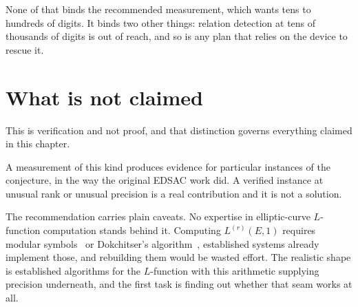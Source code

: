 None of that binds the recommended measurement, which wants tens to hundreds of digits. It binds two
other things: relation detection at tens of thousands of digits is out of reach, and so is any plan
that relies on the device to rescue it.

\section{What is not claimed}

This is verification and not proof, and that distinction governs everything claimed in this
chapter.

A measurement of this kind produces evidence for particular instances of the conjecture, in the way
the original EDSAC work did. A verified instance at unusual rank or unusual precision is a real
contribution and it is not a solution.

The recommendation carries plain caveats. No expertise in elliptic-curve $L$-function computation
stands behind it. Computing $L^{(r)}(E,1)$ requires modular symbols~\cite{src:Cremona-1997} or
Dokchitser's algorithm~\cite{src:Dokchitser-2004}, established systems already implement those, and
rebuilding them would be wasted effort. The realistic shape is established algorithms for the
$L$-function with this arithmetic supplying precision underneath, and the first task is finding out
whether that seam works at all.
